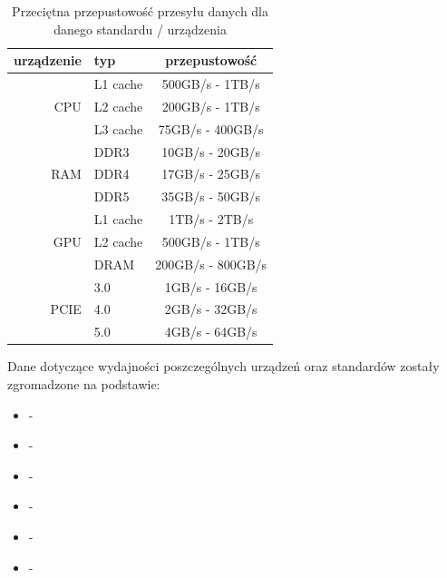 \begin{table}[H]
    \begin{center}
        \caption{Przeciętna przepustowość przesyłu danych dla danego standardu / urządzenia}
        \label{tab:Przepustowość przsyłu danych}
        \begin{tabular}{r|l|c}
            urządzenie & typ & przepustowość \\
            \hline
                       & L1 cache    & 500GB/s - 1TB/s  \\
            CPU        & L2 cache    & 200GB/s - 1TB/s  \\
                       & L3 cache    & 75GB/s - 400GB/s \\
            \hline
                       & DDR3        & 10GB/s - 20GB/s  \\
            RAM        & DDR4        & 17GB/s - 25GB/s  \\
                       & DDR5        & 35GB/s - 50GB/s  \\
            \hline
                       & L1 cache    & 1TB/s - 2TB/s    \\
            GPU        & L2 cache    & 500GB/s - 1TB/s  \\
                       & DRAM        & 200GB/s - 800GB/s\\
            \hline
            \hline
                       & 3.0         & 1GB/s - 16GB/s   \\
            PCIE       & 4.0         & 2GB/s - 32GB/s   \\
                       & 5.0         & 4GB/s - 64GB/s   \\
        \end{tabular}
    \end{center}
\end{table}

\clearpage
Dane dotyczące wydajności poszczególnych urządzeń oraz standardów zostały zgromadzone na podstawie:
\begin{itemize}
    \item \cite{bib:performance-1} - 
    \item \cite{bib:performance-2} - 
    \item \cite{bib:performance-3} - 
    \item \cite{bib:performance-4} - 
    \item \cite{bib:performance-5} - 
    \item \cite{bib:performance-6} - 
\end{itemize}




